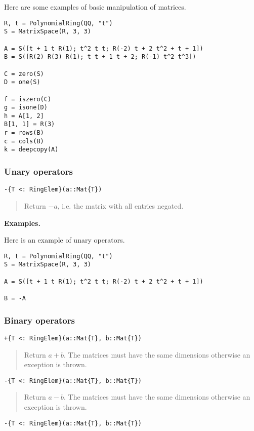 \documentclass[a4paper,10pt]{article}
\newcommand{\desc}[1]{\vspace{-3mm}\begin{quote}#1\end{quote}}
\begin{document}
Here are some examples of basic manipulation of matrices.

\begin{lstlisting}
R, t = PolynomialRing(QQ, "t")
S = MatrixSpace(R, 3, 3)

A = S([t + 1 t R(1); t^2 t t; R(-2) t + 2 t^2 + t + 1])
B = S([R(2) R(3) R(1); t t + 1 t + 2; R(-1) t^2 t^3])

C = zero(S)
D = one(S)

f = iszero(C)
g = isone(D)
h = A[1, 2]
B[1, 1] = R(3)
r = rows(B)
c = cols(B)
k = deepcopy(A)
\end{lstlisting}

\subsubsection{Unary operators}

\begin{lstlisting}
-{T <: RingElem}(a::Mat{T})
\end{lstlisting}

\desc{Return $-a$, i.e. the matrix with all entries negated.}

\textbf{Examples.}

Here is an example of unary operators.

\begin{lstlisting}
R, t = PolynomialRing(QQ, "t")
S = MatrixSpace(R, 3, 3)

A = S([t + 1 t R(1); t^2 t t; R(-2) t + 2 t^2 + t + 1])

B = -A
\end{lstlisting}

\subsubsection{Binary operators}

\begin{lstlisting}
+{T <: RingElem}(a::Mat{T}, b::Mat{T})
\end{lstlisting}

\desc{Return $a + b$. The matrices must have the same dimensions otherwise
an exception is thrown.}

\begin{lstlisting}
-{T <: RingElem}(a::Mat{T}, b::Mat{T})
\end{lstlisting}

\desc{Return $a - b$. The matrices must have the same dimensions otherwise
an exception is thrown.}

\begin{lstlisting}
-{T <: RingElem}(a::Mat{T}, b::Mat{T})
\end{lstlisting}
\end{document}
